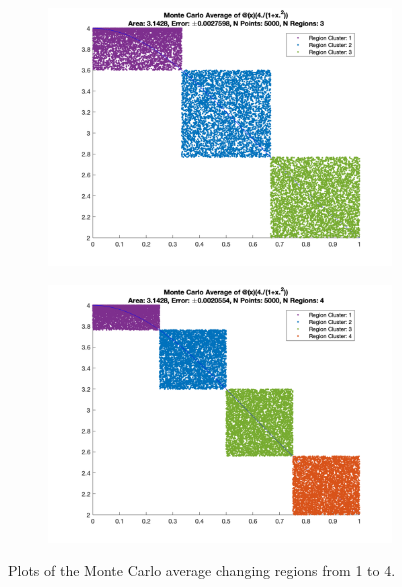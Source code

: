 \documentclass[12pt]{article}
\begin{document}
\begin{figure}[htp]
\begin{subfigure}{0.49\columnwidth}
\centering
\includegraphics[width=\textwidth]{problem_1_n_5000_reg_3.png}
\caption{}
\label{fig:time3}
\end{subfigure}\hfill
\begin{subfigure}{0.49\columnwidth}
\centering
\includegraphics[width=\textwidth]{problem_1_n_5000_reg_4.png}
\caption{}
\label{fig:time4}
\end{subfigure}

\caption{Plots of the Monte Carlo average changing regions from 1 to 4.}
\label{fig:time}

\end{figure}
\end{document}
